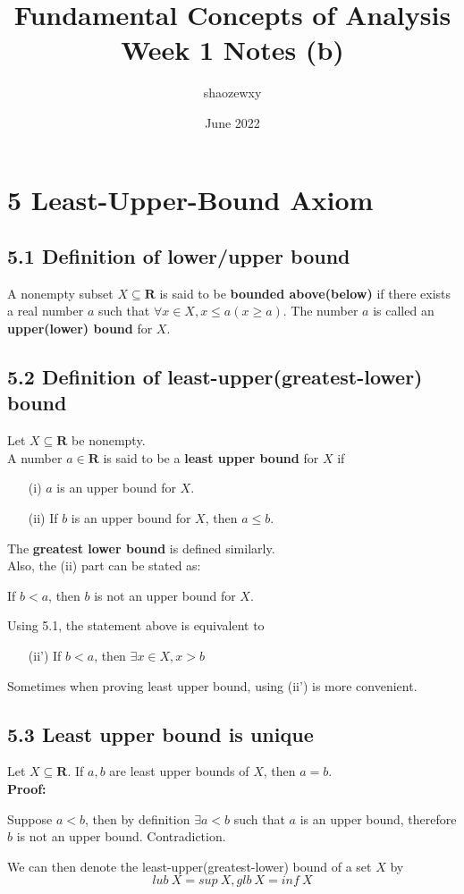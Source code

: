 \documentclass{article}
\title{Fundamental Concepts of Analysis\\
\large{Week 1 Notes (b)}}
\author{shaozewxy }
\date{June 2022}
\begin{document}
\maketitle
\section*{5 Least-Upper-Bound Axiom}
\subsection*{5.1 Definition of lower/upper bound}
A nonempty subset $X \subseteq \mathbf{R}$ is said to be \textbf{bounded above(below)} if there exists a real number $a$ such that $\forall x \in X, x \leq a(x \geq a)$. The number $a$ is called an \textbf{upper(lower) bound} for $X$.
\subsection*{5.2 Definition of least-upper(greatest-lower) bound}
Let $X \subseteq \mathbf{R}$ be nonempty.\\
A number $a \in \mathbf{R}$ is said to be a \textbf{least upper bound} for $X$ if
\begin{itemize}
    \item[(i)] $a$ is an upper bound for $X$.
    \item[(ii)] If $b$ is an upper bound for $X$, then $a \leq b$.
\end{itemize}
The \textbf{greatest lower bound} is defined similarly.\\
Also, the (ii) part can be stated as:
\begin{addmargin}[1em]{0em}
    If $b < a$, then $b$ is not an upper bound for $X$.
\end{addmargin}
Using 5.1, the statement above is equivalent to
\begin{itemize}
    \item[(ii')] If $b < a$, then $\exists x \in X, x > b$
\end{itemize}
Sometimes when proving least upper bound, using (ii') is more convenient.
\subsection*{5.3 Least upper bound is unique}
Let $X \subseteq \mathbf{R}$. If $a, b$ are least upper bounds of $X$, then $a = b$.\\
\textbf{Proof:}
\begin{addmargin}[1em]{0em}
    Suppose $a < b$, then by definition $\exists a < b$ such that $a$ is an upper bound, therefore $b$ is not an upper bound. Contradiction.
\end{addmargin}
We can then denote the least-upper(greatest-lower) bound of a set $X$ by
\begin{equation*}
    lub\ X = sup\ X, glb\ X = inf\ X
\end{equation*}
\end{document}
